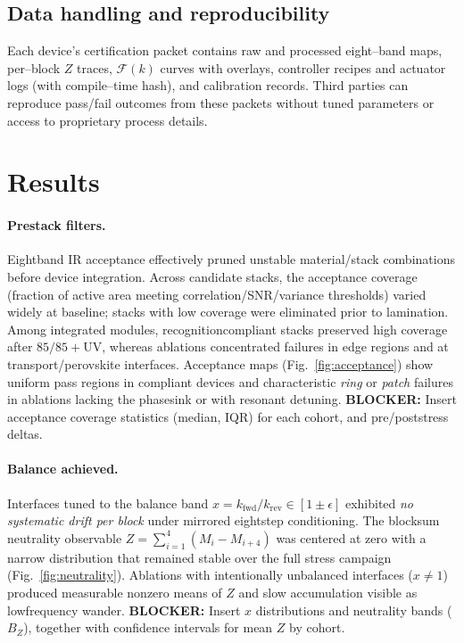 \documentclass[12pt]{article}
\begin{document}
\subsection*{Data handling and reproducibility}
Each device’s certification packet contains raw and processed eight–band maps, per–block $Z$ traces, $\mathcal{F}(k)$ curves with overlays, controller recipes and actuator logs (with compile–time hash), and calibration records. Third parties can reproduce pass/fail outcomes from these packets without tuned parameters or access to proprietary process details.

\section{Results}

\paragraph{Pre\textendash stack filters.}
Eight\textendash band IR acceptance effectively pruned unstable material/stack combinations before device integration. Across candidate stacks, the acceptance coverage (fraction of active area meeting correlation/SNR/variance thresholds) varied widely at baseline; stacks with low coverage were eliminated prior to lamination. Among integrated modules, recognition\textendash compliant stacks preserved high coverage after $85/85+\mathrm{UV}$, whereas ablations concentrated failures in edge regions and at transport/perovskite interfaces. Acceptance maps (Fig.~\ref{fig:acceptance}) show uniform pass regions in compliant devices and characteristic \emph{ring} or \emph{patch} failures in ablations lacking the phase\textendash sink or with resonant detuning. 
\textbf{BLOCKER:} Insert acceptance coverage statistics (median, IQR) for each cohort, and pre/post\textendash stress deltas.

\paragraph{Balance achieved.}
Interfaces tuned to the balance band $x=k_{\mathrm{fwd}}/k_{\mathrm{rev}}\in[1\pm\epsilon]$ exhibited \emph{no systematic drift per block} under mirrored eight\textendash step conditioning. The block\textendash sum neutrality observable $Z=\sum_{i=1}^{4}(M_i-M_{i+4})$ was centered at zero with a narrow distribution that remained stable over the full stress campaign (Fig.~\ref{fig:neutrality}). Ablations with intentionally unbalanced interfaces ($x\neq 1$) produced measurable nonzero means of $Z$ and slow accumulation visible as low\textendash frequency wander. 
\textbf{BLOCKER:} Insert $x$ distributions and neutrality bands ($B_Z$), together with confidence intervals for mean $Z$ by cohort.
\end{document}
